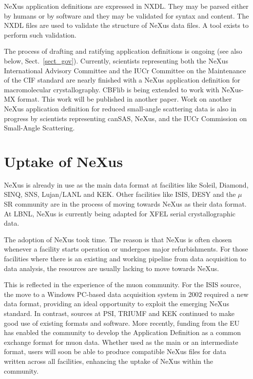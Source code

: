 \documentclass[%
 aip,
rsi,
 amsmath,amssymb,
 reprint,%
]{revtex4-1}
\begin{document}
NeXus application definitions are expressed in NXDL.  They may be parsed either by humans or by software and 
they may be validated for syntax and content.  The NXDL files are used to validate the structure of
NeXus data files. A tool exists to perform such validation.%

The process of drafting and ratifying application definitions
is ongoing (see also below, Sect.~\ref{sect_gov}).
Currently, scientists representing both
the NeXus International Advisory Committee and the IUCr Committee on the Maintenance
of the CIF standard 
are nearly finished with a NeXus application definition for macromolecular crystallography.
CBFlib\cite{cbflib} is being extended to work with NeXus-MX format. This work will be published in another paper. 
Work on another NeXus application definition for reduced small-angle scattering data
is also in progress\cite{cansas}  by scientists representing
canSAS, NeXus, and the IUCr Commission on Small-Angle Scattering.


\section{Uptake of NeXus} 

NeXus is already in use as the main data format at facilities like Soleil, Diamond, SINQ, SNS, Lujan/LANL 
and KEK. Other facilities like ISIS, DESY and the $\mu$SR community are in the process of moving towards 
NeXus as their data format. At LBNL, NeXus is currently being adapted for XFEL serial crystallographic data. 


The adoption of NeXus took time. The reason is that NeXus is often chosen whenever 
a facility starts operation or undergoes major refurbishments. For those facilities where there is an existing and working 
pipeline from data acquisition to data analysis,  the resources are usually lacking to move 
towards NeXus.

This is reflected in the experience of the muon community. For the ISIS source, the move to a Windows PC-based data acquisition 
system in 2002 required a new data format, providing an ideal opportunity to exploit the emerging NeXus standard\cite{muon1}. In 
contrast, sources at PSI, TRIUMF and KEK continued to make good use of existing formats and software. More recently, funding 
from the EU has enabled the community to develop the Application Definition as a common exchange format for muon data\cite{muon2}. 
Whether used as the main or an intermediate format, users will soon be able to produce compatible NeXus files for data written 
across all facilities, enhancing the uptake of NeXus within the community.
\end{document}
